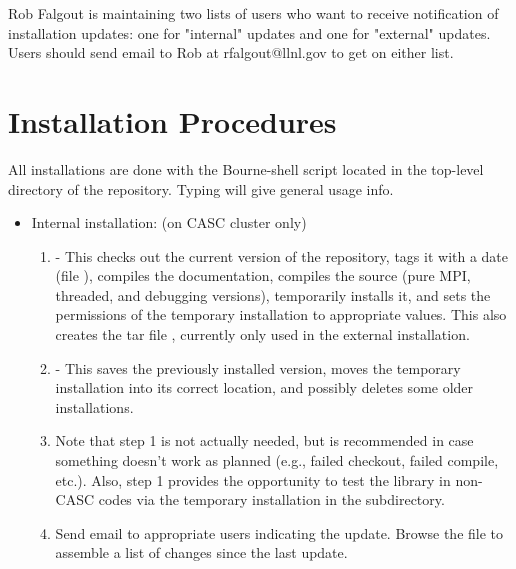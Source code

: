 Rob Falgout is maintaining two lists of users who want to receive
notification of installation updates: one for "internal" updates and
one for "external" updates.  Users should send email to Rob at
rfalgout@llnl.gov to get on either list.

\section{Installation Procedures}
\label{Installation Procedures}

All installations are done with the  Bourne-shell script
located in the top-level directory of the \hypre{} repository.  Typing
 will give general usage info.
\begin{itemize}

\item Internal installation: (on CASC cluster only)
\begin{enumerate}

   \item {} - This checks out the current version
   of the repository, tags it with a date (file ),
   compiles the documentation, compiles the source (pure MPI,
   threaded, and debugging versions), temporarily installs it, and
   sets the permissions of the temporary installation to appropriate
   values.  This also creates the tar file ,
   currently only used in the external installation.
  
   \item {} - This saves the previously
   installed version, moves the temporary installation into its
   correct location, and possibly deletes some older installations.
  
   \item Note that step 1 is not actually needed, but is recommended
   in case something doesn't work as planned (e.g., failed checkout,
   failed compile, etc.).  Also, step 1 provides the opportunity to
   test the library in non-CASC codes via the temporary installation
   in the  subdirectory.
  
   \item Send email to appropriate users indicating the update.
   Browse the  file to assemble a list
   of changes since the last update.

\end{enumerate}


\end{itemize}
